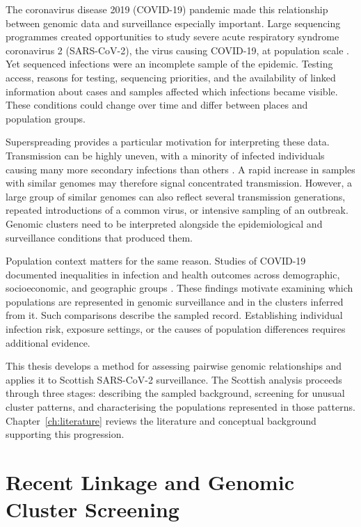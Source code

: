 The coronavirus disease 2019 (COVID-19) pandemic made this relationship between genomic data and surveillance especially important. Large sequencing programmes created opportunities to study severe acute respiratory syndrome coronavirus 2 (SARS-CoV-2), the virus causing COVID-19, at population scale \citep{Brito2022,Carter2022}. Yet sequenced infections were an incomplete sample of the epidemic. Testing access, reasons for testing, sequencing priorities, and the availability of linked information about cases and samples affected which infections became visible. These conditions could change over time and differ between places and population groups.

Superspreading provides a particular motivation for interpreting these data. Transmission can be highly uneven, with a minority of infected individuals causing many more secondary infections than others \citep{LloydSmith2005,Endo2020}. A rapid increase in samples with similar genomes may therefore signal concentrated transmission. However, a large group of similar genomes can also reflect several transmission generations, repeated introductions of a common virus, or intensive sampling of an outbreak. Genomic clusters need to be interpreted alongside the epidemiological and surveillance conditions that produced them.

Population context matters for the same reason. Studies of COVID-19 documented inequalities in infection and health outcomes across demographic, socioeconomic, and geographic groups \citep{Bambra2020,Niedzwiedz2020,Mathur2021,PublicHealthScotland2020}. These findings motivate examining which populations are represented in genomic surveillance and in the clusters inferred from it. Such comparisons describe the sampled record. Establishing individual infection risk, exposure settings, or the causes of population differences requires additional evidence.

This thesis develops a method for assessing pairwise genomic relationships and applies it to Scottish SARS-CoV-2 surveillance. The Scottish analysis proceeds through three stages: describing the sampled background, screening for unusual cluster patterns, and characterising the populations represented in those patterns. Chapter~\ref{ch:literature} reviews the literature and conceptual background supporting this progression.

\section{Recent Linkage and Genomic Cluster Screening}\label{sec:ch1_recent_linkage}

